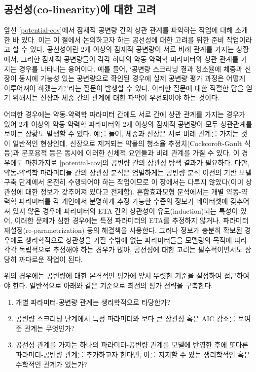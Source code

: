 \documentclass[
  11pt,
  krantz2, a4paper, twoside]{krantz}
\providecommand{\tightlist}{%
  \setlength{\itemsep}{0pt}\setlength{\parskip}{0pt}}
\theoremstyle{definition}
\theoremstyle{definition}
\theoremstyle{definition}
\theoremstyle{remark}
\begin{document}
\hypertarget{colinearity}{%
\subsection{공선성(co-linearity)에 대한 고려}\label{colinearity}}

앞선 \ref{potential-cov}에서 잠재적 공변량 간의 상관 관계를 파악하는 작업에 대해 소개한 바 있다. 이는 이 절에서 논의하고자 하는 공선성에 대한 고려를 위한 준비 작업이라고 할 수 있다. 공선성이란 2개 이상의 잠재적 공변량이 서로 비례 관계를 가지는 상황에서, 그러한 잠재적 공변량들이 각각 하나의 약동-약력학 파라미터와 상관 관계를 가지는 경우를 나타내는 용어이다. 예를 들어, `공변량 스크리닝 결과 청소율에 체중과 신장이 동시에 가능성 있는 공변량으로 확인된 경우에 실제 공변량 평가 과정은 어떻게 이루어져야 하겠는가?'라는 질문이 발생할 수 있다. 이러한 질문에 대한 적절한 답을 얻기 위해서는 신장과 체중 간의 관계에 대한 파악이 우선되어야 하는 것이다.

어떠한 경우에는 약동-약력학 파라미터 간에도 서로 간에 상관 관계를 가지는 경우가 있어 2개 이상의 약동-약력학 파라미터와 2개 이상의 잠재적 공변량이 모두 상관관계를 보이는 상황도 발생할 수 있다. 예를 들어, 체중과 신장은 서로 비례 관계를 가지는 것이 일반적인 현상인데, 신장으로 제거되는 약물의 청소율 추정치(Cockcoroft-Gault 식 등)과 분포용적 등은 동시에 이러한 신체적 요인들과 비례 관계를 가질 수 있다. 이 경우에도 마찬가지로 \ref{potential-cov}의 공변량 간의 상관성 탐색 결과가 필요하다. 다만, 약동-약력학 파라미터들 간의 상관성 분석은 엄밀하게는 공변량 분석 이전의 기반 모델 구축 단계에서 온전히 수행되어야 하는 작업이므로 이 장에서는 다루지 않았다(이미 상관성에 대한 정보가 갖추어져 있다고 전제함). 혼합효과모형 분석에서는 개별 약동-약력학 파라미터를 각 개인에서 분명하게 추정 가능한 수준의 정보가 데이터셋에 갖추어져 있지 않은 경우에 파라미터의 ETA 간의 상관성이 유도(induction)되는 특성이 있어, 이러한 문제가 심한 경우에는 특정 파라미터의 ETA를 추정하지 않거나, 파라미터 재설정(re-parametrization) 등의 해결책을 사용한다. 그러나 정보가 충분히 확보된 경우에도 생리학적으로 상관성을 가질 수밖에 없는 파라미터들을 모델링의 목적에 따라 각각 독립적으로 추정해야 하는 경우가 많아, 공선성에 대한 고려는 필수적이면서도 상당히 까다로운 작업이 된다.

위의 경우에는 공변량에 대한 본격적인 평가에 앞서 뚜렷한 기준을 설정하여 접근하여야 한다. 일반적으로 아래와 같은 기준으로 최선의 평가 전략을 구축한다.

\begin{enumerate}
\def\labelenumi{\arabic{enumi}.}
\tightlist
\item
  개별 파라미터-공변량 관계는 생리학적으로 타당한가?
\item
  공변량 스크리닝 단계에서 특정 파라미터와 보다 큰 상관성 혹은 AIC 감소를 보여준 관계는 무엇인가?
\item
  공선성 관계를 가지는 하나의 파라미터-공변량 관계를 모델에 반영한 후에 또다른 파라미터-공변량 관계를 추가하고자 한다면, 이를 지지할 수 있는 생리학적인 혹은 수학적인 관계가 있는가?
\end{enumerate}
\end{document}

